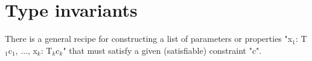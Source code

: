 
 
\section{Type invariants}\label{DepType:ClassGuard}

There is a general recipe for constructing a list of parameters or
properties \xcdmath"x$_1$: T$_1${c$_1$}, $\dots$, x$_k$: T$_k${c$_k$}" that must satisfy a given
(satisfiable) constraint \xcd"c". 

